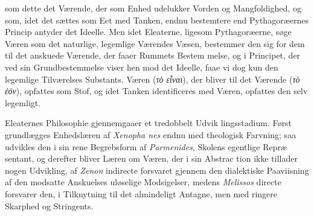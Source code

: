 \documentclass[12pt,a4paper]{book}
\newcommand{\gk}[1]{\textit{#1}}
\begin{document}
%
%
%
%
som dette det Værende, der som Enhed udelukker Vorden og
Mangfoldighed, og som, idet det sættes som Eet med Tanken,
endnu bestemtere end Pythagoræernes Princip antyder det Ideelle.
Men idet Eleaterne, ligesom Pythagoræerne, søge Væren som
det naturlige, legemlige Værendes Væsen, bestemmer den sig
for dem til det anskuede Værende, der faaer Rummets Bestem\-%
melse, og i Principet, der ved sin Grundbestemmelse viser
hen mod det Ideelle, faae vi dog kun den legemlige Tilværelses
Substants. Væren (\gk{τὸ εἶναι}), der bliver til det Værende
(\gk{τὸ ἐόν}), opfattes som Stof, og idet Tanken identificeres
med Væren, opfattes den selv legemligt.

Eleaternes Philosophie gjennemgaaer et tredobbelt Udvik\-%
lingsstadium. Først grundlægges Enhedslæren af \emph{Xenopha\-%
nes} endnu med theologisk Farvning; saa udvikles den i sin
rene Begrebsform af \emph{Parmenides}, Skolens egentlige Repræ\-%
sentant, og derefter bliver Læren om Væren, der i sin Abstrac\-%
tion ikke tillader nogen Udvikling, af \emph{Zenon} indirecte forsvaret
gjennem den dialektiske Paaviisning af den modsatte Anskuelses
uløselige Modsigelser, medens \emph{Melissos} directe forsvarer den,
i Tilknytning til det almindeligt Antagne, men med ringere
Skarphed og Stringents.
\end{document}
